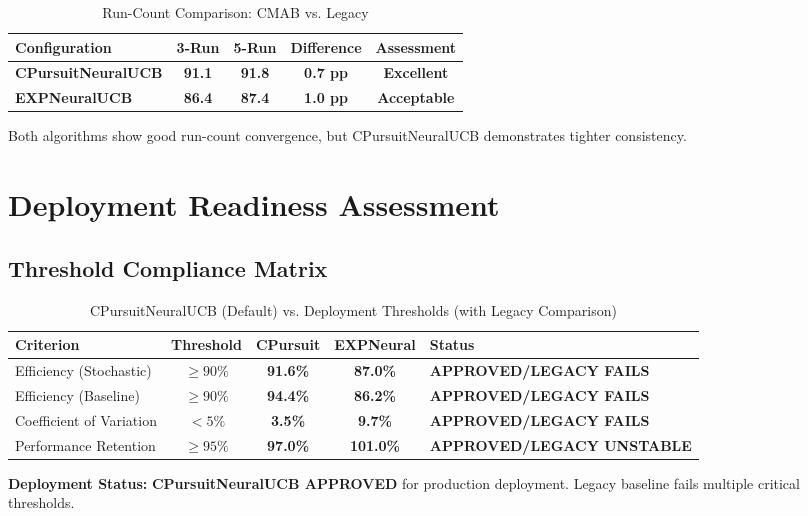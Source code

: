 \documentclass[12pt,a4paper]{article}
\newcommand{\success}[1]{\textcolor{accentgreen}{\textbf{#1}}}
\newcommand{\legacy}[1]{\textcolor{legacycolor}{\textbf{#1}}}
\begin{document}
\begin{table}[H]
\centering
\caption{Run-Count Comparison: CMAB vs. Legacy}
\begin{tabular}{@{}lcccc@{}}
\toprule
\textbf{Configuration} & \textbf{3-Run} & \textbf{5-Run} & \textbf{Difference} & \textbf{Assessment} \\
\midrule
\success{CPursuitNeuralUCB} & \success{91.1} & \success{91.8} & \success{0.7 pp} & \success{Excellent} \\
\legacy{EXPNeuralUCB} & \legacy{86.4} & \legacy{87.4} & \legacy{1.0 pp} & \legacy{Acceptable} \\
\bottomrule
\end{tabular}
\end{table}

Both algorithms show good run-count convergence, but CPursuitNeuralUCB demonstrates tighter consistency.

\section{Deployment Readiness Assessment}

\subsection{Threshold Compliance Matrix}

\begin{table}[H]
\centering
\caption{CPursuitNeuralUCB (Default) vs. Deployment Thresholds (with Legacy Comparison)}
\begin{tabular}{@{}lcccl@{}}
\toprule
\textbf{Criterion} & \textbf{Threshold} & \textbf{CPursuit} & \textbf{EXPNeural} & \textbf{Status} \\
\midrule
Efficiency (Stochastic) & $\geq 90\%$ & \success{91.6\%} & \legacy{87.0\%} & \success{APPROVED/LEGACY FAILS} \\
Efficiency (Baseline) & $\geq 90\%$ & \success{94.4\%} & \legacy{86.2\%} & \success{APPROVED/LEGACY FAILS} \\
Coefficient of Variation & $< 5\%$ & \success{3.5\%} & \legacy{9.7\%} & \success{APPROVED/LEGACY FAILS} \\
Performance Retention & $\geq 95\%$ & \success{97.0\%} & \legacy{101.0\%} & \success{APPROVED/LEGACY UNSTABLE} \\
\bottomrule
\end{tabular}
\end{table}

\textbf{Deployment Status:} \success{\textbf{CPursuitNeuralUCB APPROVED}} for production deployment. Legacy baseline fails multiple critical thresholds.
\end{document}
